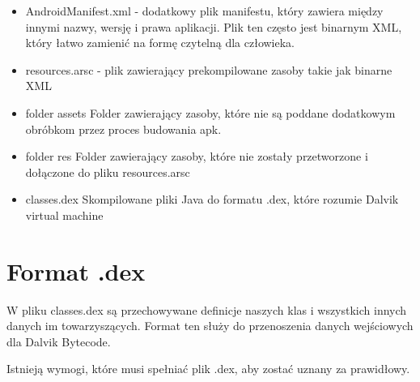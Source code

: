 \documentclass[12pt,a4paper,leqno,oneside,titlepage]{book}
\begin{document}
\begin{itemize}
\item AndroidManifest.xml - dodatkowy plik manifestu, który zawiera między innymi nazwy, wersję i prawa aplikacji. Plik ten często jest binarnym XML, który łatwo zamienić na formę czytelną dla człowieka.

\item resources.arsc - plik zawierający prekompilowane zasoby takie jak binarne XML

\item folder assets
Folder zawierający zasoby, które nie są poddane dodatkowym obróbkom przez proces budowania apk.

\item folder res
Folder zawierający zasoby, które nie zostały przetworzone i dołączone do pliku resources.arsc

\item classes.dex Skompilowane pliki Java do formatu .dex, które rozumie Dalvik virtual machine

\end{itemize}



\section{Format .dex}

W pliku classes.dex są przechowywane definicje naszych klas i wszystkich innych danych im towarzyszących.
Format ten służy do przenoszenia danych wejściowych dla Dalvik Bytecode. 

Istnieją wymogi, które musi spełniać plik .dex, aby zostać uznany za prawidłowy.
\end{document}
